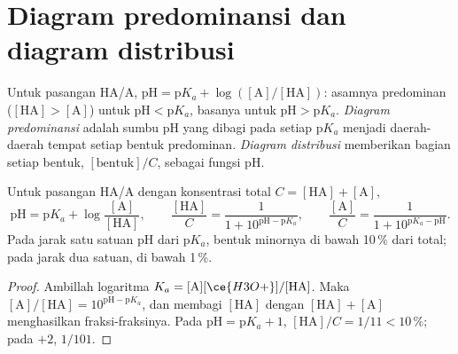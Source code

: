 \section{Diagram predominansi dan diagram distribusi}

\begin{definition}\label{def:b1:predominant-reaction:predominance}
Untuk pasangan HA/A, $\mathrm{pH} = \mathrm{p}K_a + \log([\mathrm{A}]/[\mathrm{HA}])$:
asamnya predominan ($[\mathrm{HA}] > [\mathrm{A}]$) untuk
$\mathrm{pH} < \mathrm{p}K_a$, basanya untuk $\mathrm{pH} > \mathrm{p}K_a$.
\emph{Diagram predominansi} adalah sumbu pH
yang dibagi pada setiap $\mathrm{p}K_a$ menjadi daerah-daerah tempat
setiap bentuk predominan.
\emph{Diagram distribusi} memberikan bagian setiap bentuk, $[\text{bentuk}]/C$, sebagai
fungsi pH.
\end{definition}

\begin{proposition}\label{prop:b1:predominant-reaction:henderson}
Untuk pasangan HA/A dengan konsentrasi total $C = [\mathrm{HA}] + [\mathrm{A}]$,
\[
  \mathrm{pH} = \mathrm{p}K_a + \log\frac{[\mathrm{A}]}{[\mathrm{HA}]}, \qquad
  \frac{[\mathrm{HA}]}{C} = \frac{1}{1 + 10^{\mathrm{pH} - \mathrm{p}K_a}}, \qquad
  \frac{[\mathrm{A}]}{C} = \frac{1}{1 + 10^{\mathrm{p}K_a - \mathrm{pH}}} .
\]
Pada jarak satu satuan pH dari $\mathrm{p}K_a$, bentuk minornya di bawah
10\,\% dari total; pada jarak dua satuan, di bawah 1\,\%.
\end{proposition}

\begin{proof}
Ambillah logaritma $K_a = [\mathrm{A}][\ce{H3O+}]/[\mathrm{HA}]$. Maka
$[\mathrm{A}]/[\mathrm{HA}] = 10^{\mathrm{pH}-\mathrm{p}K_a}$, dan membagi
$[\mathrm{HA}]$ dengan $[\mathrm{HA}] + [\mathrm{A}]$ menghasilkan
fraksi-fraksinya. Pada
$\mathrm{pH} = \mathrm{p}K_a + 1$, $[\mathrm{HA}]/C = 1/11 < 10\,\%$; pada
$+2$, $1/101$.
\end{proof}

